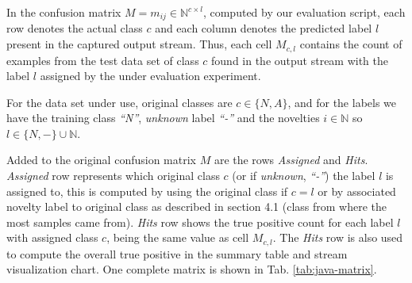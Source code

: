 In the confusion matrix $M = m_{ij} \in \mathbb{N} ^{c \times{} l}$, computed by
our evaluation script, each row denotes %
the actual class $c$ and each column denotes the predicted label $l$ present in
the captured output stream.
Thus, each cell $M_{c, l}$ contains the count of examples from the test data set
of class $c$ found in the output stream with the label $l$ assigned by the under
evaluation experiment.

For the data set under use, original classes are $c \in \{N, A\}$, and for the
labels we have the training class
\emph{``N''}, \emph{unknown} label \emph{``-''} and the novelties $i \in
\mathbb{N}$ so $l \in \{N, -\} \cup \mathbb{N}$.

Added to the original confusion matrix $M$ are the rows \emph{Assigned} and
\emph{Hits}.
\emph{Assigned} row represents which original class $c$ (or if \emph{unknown},
\emph{``-''}) the label $l$ is assigned to, this is computed by using the
original class if $c = l$ or by associated novelty label to original class as
described in \cite{DeFaria2015evaluation} section 4.1
(class from where the most samples came from).
\emph{Hits} row shows the true positive count for each label $l$
with assigned class $c$, being the same value as cell $M_{c, l}$.
The \emph{Hits} row is also used to compute the overall true positive
in the summary table and stream visualization chart.
One complete matrix is shown in Tab. \ref{tab:java-matrix}.

%   

